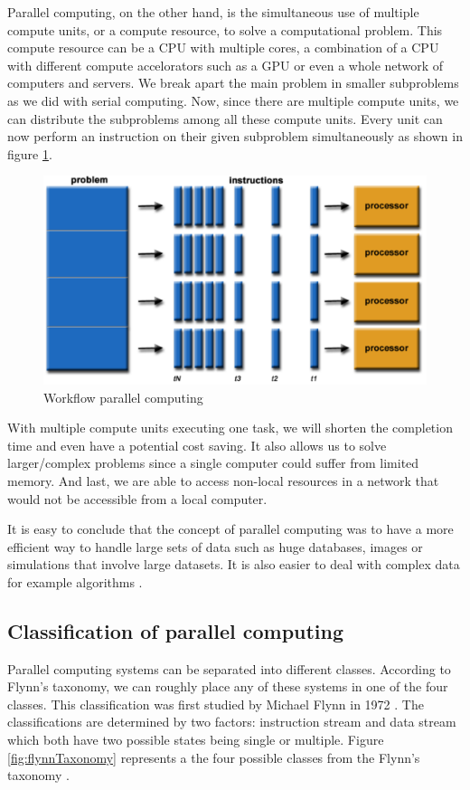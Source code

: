 \documentclass[a4paper, 11pt]{report}
\begin{document}
Parallel computing, on the other hand, is the simultaneous use of multiple compute units, or a compute resource, to solve a computational problem. This compute resource can be a CPU with multiple cores, a combination of a CPU with different compute accelorators such as a GPU or even a whole network of computers and servers. We break apart the main problem in smaller subproblems as we did with serial computing. Now, since there are multiple compute units, we can distribute the subproblems among all these compute units. Every unit can now perform an instruction on their given subproblem simultaneously as shown in figure \ref{fig:ParallelC}.
	\begin{figure}[ht]
		\centering
		\includegraphics[scale=.4]{images/parallelProblem.pdf}
		\caption{Workflow parallel computing}
		\label{fig:ParallelC}
	\end{figure}
With multiple compute units executing one task, we will shorten the completion time and even have a potential cost saving. It also allows us to solve larger/complex problems since a single computer could suffer from limited memory. And last, we are able to access non-local resources in a network that would not be accessible from a local computer.

It is easy to conclude that the concept of parallel computing was to have a more efficient way to handle large sets of data such as huge databases, images or simulations that involve large datasets. It is also easier to deal with complex data for example algorithms \cite{barney2012parallel}.

	\subsection{Classification of parallel computing}
Parallel computing systems can be separated into different classes. According to Flynn's taxonomy, we can roughly place any of these systems in one of the four classes. This classification was first studied by Michael Flynn in 1972 \cite{Unit2COPC}. The classifications are determined by two factors: instruction stream and data stream which both have two possible states being single or multiple. Figure \ref{fig:flynnTaxonomy} represents a the four possible classes from the Flynn's taxonomy \cite{barney2012parallel}.
\end{document}
